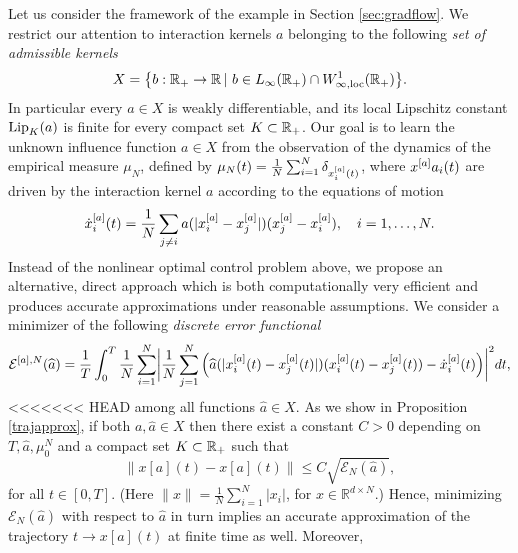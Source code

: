 Let us consider the framework of the example in Section \ref{sec:gradflow}. We restrict our attention to interaction kernels $a$ belonging to the following \textit{set of admissible kernels}
\begin{align*}
	X=\bigl\{b:\mathbb{R}_+\rightarrow\mathbb{R}\,|\ b \in L_{\infty}(\mathbb{R}_+) \cap W^{1}_{\infty,\textup{loc}}(\mathbb{R}_+) \bigr \}.
\end{align*}
In particular every $a \in X$ is weakly differentiable, and its local Lipschitz constant $\textup{Lip}_{K}(a)$ is finite for every compact set $K \subset \mathbb{R}_+$.
Our goal is to learn the unknown influence function $a \in X$ from the observation of the dynamics of the empirical measure $\mu_N$, defined by $\mu_N(t)=\frac{1}{N} \sum_{i=1}^N \delta_{x^{[a]}_i(t)}$, where $x^{[a]} a_i(t)$ are driven by the interaction kernel $a$ according to the equations of motion
\begin{equation}\label{fdgradientflow2}
\dot{x}^{[a]}_i(t) = \frac{1}{N} \sum_{j \neq i} a(| x^{[a]}_i -  x^{[a]}_j |) (x^{[a]}_j - x^{[a]}_i), \quad i=1,\dots,N.
\end{equation}
Instead of the nonlinear optimal control problem above, we propose an alternative, direct approach which is both computationally very efficient and produces accurate approximations under reasonable assumptions.
We consider a minimizer of the following \textit{discrete error functional}
\begin{align}\label{eq-def-error1}
	\begin{split}
	\mathcal E^{[a],N}(\widehat a) = \frac{1}{T}\int_0^T\frac{1}{N}\sum_{i=1}^N\biggl|\frac{1}{N}\sum_{j=1}^N
			\left(\widehat a(|x^{[a]}_i(t)-x^{[a]}_j(t)|)(x^{[a]}_i(t) - x^{[a]}_j(t))-\dot{x}^{[a]}_i(t)\right)\biggr|^2 dt,
	\end{split}
\end{align}
<<<<<<< HEAD
among all functions $\widehat a \in X$. As we show in Proposition \ref{trajapprox}, if both $a, \widehat a \in X$ then there exist a constant $C>0$ depending on $T, \widehat a, \mu_0^N$ and a compact set $K \subset \mathbb{R}_+$ such that
$$
\| x[a](t) -x[a](t) \| \leq C \sqrt{\mathcal E_N(\widehat a)}, 
$$
for all $t \in [0,T]$. (Here $\| x \| = \frac{1}{N} \sum_{i=1}^N |x_i|$, for $x \in \mathbb R^{d \times N}$.) Hence, minimizing $\mathcal E_N(\widehat a)$ with respect to $\widehat a$ in turn implies an accurate approximation of the trajectory $t \to x[a](t)$ at finite time as well. Moreover,
